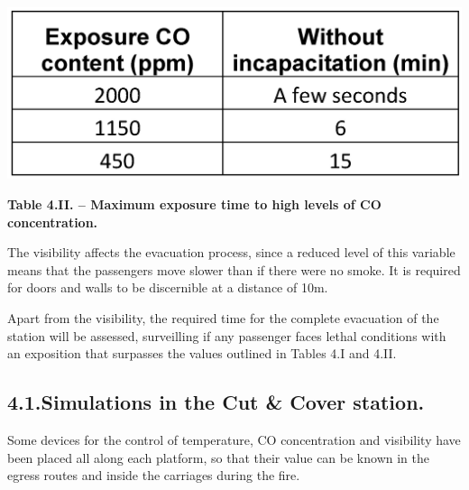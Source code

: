 \documentclass{article}
\begin{document}
\begin{mdcenter}%

\noindent{}\includegraphics[keepaspectratio=true,width=\dimmin{}{\dimwidth{0.40}}]{images/Table-4.II}{}%
\end{mdcenter}%

\begin{mdcenter}%

\noindent{}\textbf{Table 4.II. – Maximum exposure time to high levels of CO concentration.}%
\end{mdcenter}%

\noindent{}The visibility affects the evacuation process, since a reduced level of this variable 
means that the passengers move slower than if there were no smoke. It is required for 
doors and walls to be discernible at a distance of 10m.%

Apart from the visibility, the required time for the complete evacuation of the station 
will be assessed, surveilling if any passenger faces lethal conditions with an 
exposition that surpasses the values outlined in Tables 4.I and 4.II.%

\subsection{4.1.\hspace*{0.5em}Simulations in the Cut \& Cover station.}\label{sec-simulations-in-the-cut-cover-station}%

\noindent{}Some devices for the control of temperature, CO concentration and visibility have been 
placed all along each platform, so that their value can be known in the egress routes 
and inside the carriages during the fire.%
\end{document}

